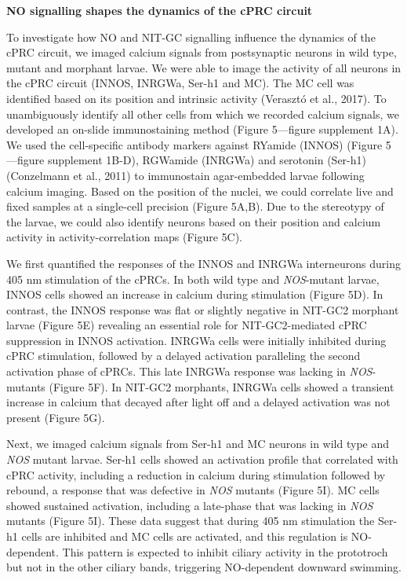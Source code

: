 \documentclass[
  10pt,
  onecolumn]{article}
\begin{document}
\textbf{NO signalling shapes the dynamics of the cPRC circuit}

To investigate how NO and NIT-GC signalling influence the dynamics of
the cPRC circuit, we imaged calcium signals from postsynaptic neurons in
wild type, mutant and morphant larvae. We were able to image the
activity of all neurons in the cPRC circuit (INNOS, INRGWa, Ser-h1 and
MC). The MC cell was identified based on its position and intrinsic
activity (Verasztó et al., 2017). To unambiguously identify all other
cells from which we recorded calcium signals, we developed an on-slide
immunostaining method (Figure 5---figure supplement 1A). We used the
cell-specific antibody markers against RYamide (INNOS) (Figure
5---figure supplement 1B-D), RGWamide (INRGWa) and serotonin (Ser-h1)
(Conzelmann et al., 2011) to immunostain agar-embedded larvae following
calcium imaging. Based on the position of the nuclei, we could correlate
live and fixed samples at a single-cell precision (Figure 5A,B). Due to
the stereotypy of the larvae, we could also identify neurons based on
their position and calcium activity in activity-correlation maps (Figure
5C).

We first quantified the responses of the INNOS and INRGWa interneurons
during 405 nm stimulation of the cPRCs. In both wild type and
\emph{NOS}-mutant larvae, INNOS cells showed an increase in calcium
during stimulation (Figure 5D). In contrast, the INNOS response was flat
or slightly negative in NIT-GC2 morphant larvae (Figure 5E) revealing an
essential role for NIT-GC2-mediated cPRC suppression in INNOS
activation. INRGWa cells were initially inhibited during cPRC
stimulation, followed by a delayed activation paralleling the second
activation phase of cPRCs. This late INRGWa response was lacking in
\emph{NOS}-mutants (Figure 5F). In NIT-GC2 morphants, INRGWa cells
showed a transient increase in calcium that decayed after light off and
a delayed activation was not present (Figure 5G).

Next, we imaged calcium signals from Ser-h1 and MC neurons in wild type
and \emph{NOS} mutant larvae. Ser-h1 cells showed an activation profile
that correlated with cPRC activity, including a reduction in calcium
during stimulation followed by rebound, a response that was defective in
\emph{NOS} mutants (Figure 5I). MC cells showed sustained activation,
including a late-phase that was lacking in \emph{NOS} mutants (Figure
5I). These data suggest that during 405 nm stimulation the Ser-h1 cells
are inhibited and MC cells are activated, and this regulation is
NO-dependent. This pattern is expected to inhibit ciliary activity in
the prototroch but not in the other ciliary bands, triggering
NO-dependent downward swimming.
\end{document}
